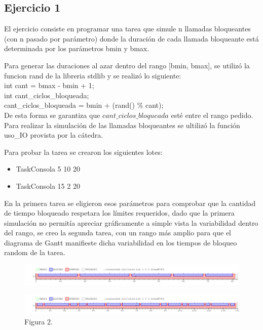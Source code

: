\subsection{Ejercicio 1}
El ejercicio consiste en programar una tarea que simule n llamadas bloqueantes (con n pasado por parámetro) donde la duración de cada llamada bloqueante está determinada por los parámetros bmin y bmax.

Para generar las duraciones al azar dentro del rango [bmin, bmax], se utilizó la funcion rand de la libreria stdlib y se realizó lo siguiente:\\

int cant = bmax - bmin + 1; \\
int cant_ciclos_bloqueada;\\
cant_ciclos_bloqueada = bmin + (rand() \% cant);\\

De esta forma se garantiza que $cant\_ciclos\_bloqueada$ esté entre el rango pedido.
Para realizar la simulación de las llamadas bloqueantes se ultilizó la función uso_IO provista por la cátedra.

Para probar la tarea se crearon los siguientes lotes:

\begin{itemize}
\item TaskConsola 5 10 20 
\item TaskConsola 15 2 20 
\end{itemize}

En la primera tarea se eligieron esos parámetros para comprobar que la cantidad de tiempo bloqueado respetara los límites requeridos, dado que la primera simulación no permitía apreciar gráficamente a simple vista la variabilidad dentro del rango, se creo la segunda tarea, con un rango más amplio para que el diagrama de Gantt manifieste dicha variabilidad en los tiempos de bloqueo random de la tarea.

\begin{figure}[h]
  \includegraphics[width=\textwidth]{../ej1/lote1.png}
  \caption{}
\end{figure}

\begin{figure}[h]
  \includegraphics[width=\textwidth]{../ej1/lote2.png}
  \caption{Figura 2.}
\end{figure}